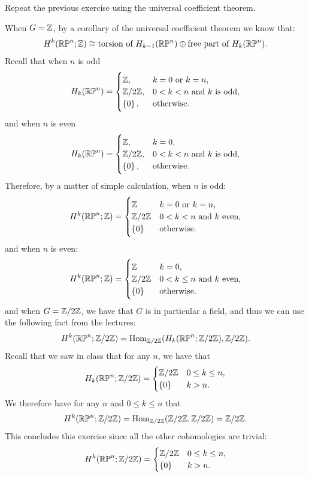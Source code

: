 \documentclass[11pt,a4paper]{article}
\begin{document}
\begin{exercise}
  Repeat the previous exercise using the universal coefficient theorem.
\end{exercise}
\begin{solution}
  When $G = \mathbb{Z}$,
  by a corollary of the universal coefficient theorem we know that:
  \[
    H^k(\mathbb{RP}^n;\mathbb{Z}) \cong
    \text{torsion of } H_{k-1}(\mathbb{RP}^n) \oplus
    \text{free part of } H_{k}(\mathbb{RP}^n).
  \]
  Recall that when $n$ is odd
  \[
    H_k(\mathbb{RP}^n) =
    \begin{cases}
      \mathbb{Z}, &k = 0 \text{ or } k = n, \\
      \mathbb{Z}/2\mathbb{Z}, &0 < k < n \text{ and } \text{$k$ is odd}, \\
      \left\{0\right\}, &\text{otherwise}.
    \end{cases}
  \]
  and when $n$ is even
  \[
    H_k(\mathbb{RP}^n) =
    \begin{cases}
      \mathbb{Z}, &k = 0, \\
      \mathbb{Z}/2\mathbb{Z}, &0 < k < n \text{ and } \text{$k$ is odd}, \\
      \left\{0\right\}, &\text{otherwise}.
    \end{cases}
  \]
  Therefore, by a matter of simple calculation, when $n$ is odd:
  \[
    H^k(\mathbb{RP}^n;\mathbb{Z}) =
    \begin{cases}
      \mathbb{Z} &k = 0 \text{ or } k = n, \\
      \mathbb{Z}/2\mathbb{Z} &0 < k < n \text{ and } k\text{ even}, \\
      \left\{0\right\} &\text{otherwise}.
    \end{cases}
  \]
  and when $n$ is even:
  \[
    H^k(\mathbb{RP}^n;\mathbb{Z}) =
    \begin{cases}
      \mathbb{Z} &k = 0, \\
      \mathbb{Z}/2\mathbb{Z} &0 < k \le n \text{ and } k\text{ even}, \\
      \left\{0\right\} &\text{otherwise}.
    \end{cases}
  \]
  and when $G = \mathbb{Z}/2\mathbb{Z}$, we have that $G$ is in particular
  a field, and thus we can use the following fact from the lectures:
  \[
    H^k(\mathbb{RP}^n;\mathbb{Z}/2\mathbb{Z}) =
    \operatorname{Hom}_{\mathbb{Z}/2\mathbb{Z}}(H_k(\mathbb{RP}^n ; \mathbb{Z}/2\mathbb{Z}), \mathbb{Z}/2\mathbb{Z}).
  \]
  Recall that we saw in class that for any $n$, we have that
  \[
    H_k(\mathbb{RP}^n ; \mathbb{Z}/2\mathbb{Z}) =
    \begin{cases}
      \mathbb{Z}/2\mathbb{Z} &0 \le k \le n, \\
      \left\{0\right\} &k > n.
    \end{cases}
  \]
  We therefore have for any $n$ and $0 \le k \le n$ that
  \[
    H^k(\mathbb{RP}^n;\mathbb{Z}/2\mathbb{Z}) =
    \operatorname{Hom}_{\mathbb{Z}/2\mathbb{Z}}(\mathbb{Z}/2\mathbb{Z}, \mathbb{Z}/2\mathbb{Z}) = \mathbb{Z}/2\mathbb{Z}.
  \]
  This concludes this exercise since all the other cohomologies are trivial:
  \[
    H^k(\mathbb{RP}^n;\mathbb{Z}/2\mathbb{Z}) =
    \begin{cases}
      \mathbb{Z}/2\mathbb{Z} &0 \le k \le n, \\
      \left\{0\right\} &k > n.
    \end{cases}
  \]
\end{solution}
\end{document}
